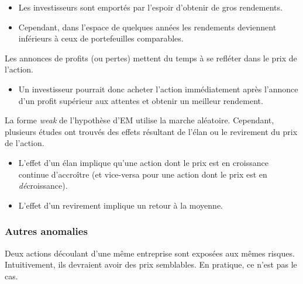 \documentclass[10pt, french]{article}
\begin{document}
\begin{multicols*}{2}
\begin{definitionNOHFILLprop}
\begin{itemize}
	\item	Les investisseurs sont emportés par l'espoir d'obtenir de gros rendements.
	\item	Cependant, dans l'espace de quelques années les rendements deviennent inférieurs à ceux de portefeuilles comparables.
\end{itemize}
\end{definitionNOHFILLprop}

\begin{definitionNOHFILLprop}
Les annonces de profits (ou pertes) mettent du temps à se refléter dans le prix de l'action. 

\begin{itemize}
	\item	Un investisseur pourrait donc acheter l'action immédiatement après l'annonce d'un profit supérieur aux attentes et obtenir un meilleur rendement.
\end{itemize}
\end{definitionNOHFILLprop}

\begin{definitionNOHFILLprop}
La forme \og \textit{weak} \fg{} de l'hypothèse d'EM utilise la marche aléatoire. Cependant, plusieurs études ont trouvés des effets résultant de l'élan ou le revirement du prix de l'action.
\begin{itemize}
	\item	L'effet d'un élan implique qu'une action dont le prix est en croissance continue d'accroître (et vice-versa pour une action dont le prix est en \textit{dé}croissance). 
	\item	L'effet d'un revirement implique un retour à la moyenne.
\end{itemize}
\end{definitionNOHFILLprop}

\subsubsection{Autres anomalies}
\begin{definitionNOHFILLprop}
Deux actions découlant d'une même entreprise sont exposées aux mêmes risques. Intuitivement, ils devraient avoir des prix semblables. En pratique, ce n'est pas le cas.
\end{definitionNOHFILLprop}


\end{multicols*}
\end{document}
